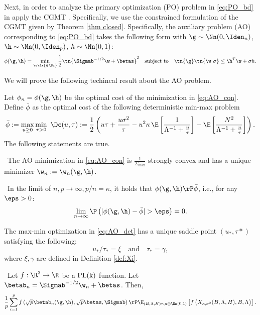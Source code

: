 Next, in order to analyze the primary optimization (PO) problem in \eqref{eq:PO_bd} in apply the CGMT \cite{thrampoulidis2015lasso}. Specifically, we use the constrained formulation of the CGMT given by Theorem \ref{thm closed}.  Specifically, the auxiliary problem (AO) corresponding to \eqref{eq:PO_bd} takes the following form with $\g\sim\Nn(0,\Iden_n)$, $\h\sim\Nn(0,\Iden_p)$, $h\sim \Nn(0,1)$:%
\begin{align}
\phi(\g,\h) = \min_{\w\fx{\in\Bc}} \frac{1}{2}\tn{\Sigmab^{-1/2}\w+\betas}^2\quad\text{subject to}\quad \tn{\g}\tn{\w~{\sigma}}\leq \h^T\w+\sigma h.\label{eq:AO_con}
\end{align}%

We will prove the following techincal result about the AO problem.
\begin{lemma}\label{lem:AO}
Let $\phi_n=\phi(\g,\h)$ be the optimal cost of the minimization in \eqref{eq:AO_con}. Define $\bar\phi$ as the optimal cost of the following deterministic min-max problem
\begin{align}\label{eq:AO_det}
\bar\phi:=\max_{u\geq 0}\min_{\tau>0}~ \Dc(u,\tau):=\frac{1}{2}\left({u\tau} + \frac{u\sigma^2}{\tau} - u^2\kappa\,\E\left[ \frac{1}{\Lambda^{-1}+\frac{u}{\tau}} \right] - \E\left[\frac{N^2}{\Lambda^{-1}+\frac{u}{\tau}}\right] \right).
\end{align}
The following statements are true.

~The AO minimization in \eqref{eq:AO_con} is $\frac{1}{\Sigma_{\max}}$-strongly convex and has a unique minimizer $\w_n:=\w_n(\g,\h)$.

~In the limit of $n,p\rightarrow\infty, p/n=\kappa$, it holds that $\phi(\g,\h)\rP\bar\phi$, i.e., for any $\eps>0$:
$$
\lim_{n\rightarrow\infty}\P\left(|\phi(\g,\h)-\bar\phi|>\eps\right) = 0.
$$

 The max-min optimization in \eqref{eq:AO_det} has a unique saddle point $(u_*,\tau*)$ satisfying the following: 
$$
u_*/\tau_* = \xi\quad\text{and}\quad\tau_* = \gamma,
$$
where $\xi, \gamma$ are defined in Definition \ref{def:Xi}.


~Let $f:\R^3\rightarrow\R$ be a $\rm{PL}({k})$ function. Let $\betab_n=\Sigmab^{-1/2}\w_n + \betas$. Then,
$$
\frac{1}{p}\sum_{i=1}^{p}f\left(\sqrt{p}\betab_n(\g,\h),\sqrt{p}\betas,\Sigmab\right) \rP \E_{(B,\Lambda,H)\sim\mu\otimes	\Nn(0,1)}\left[f\left(X_{\kappa,\sigma^2}(B,\Lambda,H),B,\Lambda\right) \right].
$$


~



\end{lemma}




